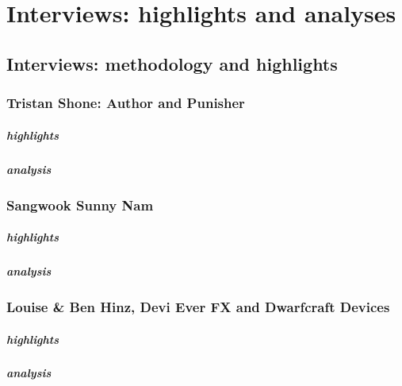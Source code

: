 \chapter{Interviews: highlights and analyses}\label{interviews}
\section{Interviews: methodology and highlights}



\subsection{Tristan Shone: Author and Punisher}

\paragraph{highlights}
\paragraph{analysis}

\subsection{Sangwook Sunny Nam}
\paragraph{highlights}
\paragraph{analysis}

\subsection{Louise \& Ben Hinz, Devi Ever FX and Dwarfcraft Devices}
\paragraph{highlights}
\paragraph{analysis}

